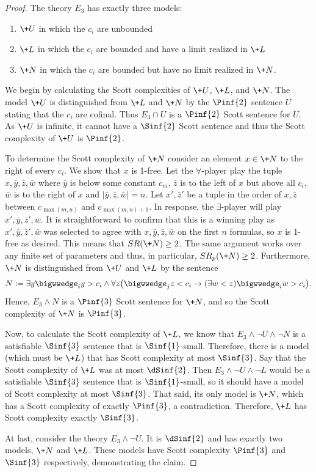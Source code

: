 \documentclass[10pt,a4paper]{amsart}
\renewcommand{\-}{\text{-}}
\begin{document}
\begin{proof}
The theory $E_3$ has exactly three models:
\begin{enumerate}
	\item $\+U$ in which the $c_i$ are unbounded
	\item $\+L$ in which the $c_i$ are bounded and have a limit realized in $\+L$
	\item $\+N$ in which the $c_i$ are bounded but have no limit realized in $\+N$.
\end{enumerate}
We begin by calculating the Scott complexities of $\+U$, $\+L$, and $\+N$.
The model $\+U$ is distinguished from $\+L$ and $\+N$ by the $\Pinf{2}$ sentence $U$ stating that the $c_i$ are cofinal. Thus $E_3\cap U$ is a $\Pinf{2}$ Scott sentence for $U$. As $\+U$ is infinite, it cannot have a $\Sinf{2}$ Scott sentence and thus the Scott complexity of $\+U$ is $\Pinf{2}$.

To determine the Scott complexity of $\+N$ consider an element $x\in \+N$ to the right of every $c_i$.
We show that $x$ is 1-free.
Let the $\forall$-player play the tuple $x,\bar y,\bar z,\bar w$ where $\bar y $ is below some constant $c_m$, $\bar z$ is to the left of $x$ but above all $c_i$, $\bar w$ is to the right of $x$ and $|\bar y,\bar z, \bar w|=n$.
Let $x',\bar{z}'$ be a tuple in the order of $x,\bar{z}$ between $c_{\max(m,n)}$ and $c_{\max(m,n)+1}$. 
In response, the $\exists$-player will play $x',\bar y,\bar z',\bar w$.
It is straightforward to confirm that this is a winning play as $x',\bar y,\bar z',\bar w$ was selected to agree with $x,\bar y,\bar z,\bar w$ on the first $n$ formulas, so $x$ is 1-free as desired.
This means that $SR(\+N)\geq 2$.
The same argument works over any finite set of parameters and thus, in particular, $SR_p(\+N)\geq 2$. %
Furthermore, $\+N$ is distinguished from $\+U$ and $\+L$ by the sentence 
\[N:=\exists y \bigwwedge_i y>c_i \land \forall z \big( \bigwwedge_j z<c_i \rightarrow (\exists w<z)  \bigwwedge_i w>c_i\big).\]
Hence, $E_3\land N$ is a $\Pinf{3}$ Scott sentence for $\+N$, and so the Scott complexity of $\+N$ is $\Pinf{3}$.

Now, to calculate the Scott complexity of $\+L$, we know that $E_3\land \lnot U\land \lnot N$ is a satisfiable $\Sinf{3}$ sentence that is $\Sinf{1}$-small.
Therefore, there is a model (which must be $\+L$) that has Scott complexity at most $\Sinf{3}$.
Say that the Scott complexity of $\+L$ was at most $\dSinf{2}$.
Then $E_3\land \lnot U\land \lnot L$ would be a satisfiable $\Sinf{3}$ sentence that is $\Sinf{1}$-small, so it should have a model of Scott complexity at most $\Sinf{3}$.
That said, its only model is $\+N$, which has a Scott complexity of exactly $\Pinf{3}$, a contradiction.
Therefore, $\+L$ has Scott complexity exactly $\Sinf{3}$.

At last, consider the theory $E_3\land\lnot U$.
It is $\dSinf{2}$ and has exactly two models, $\+N$ and $\+L$.
These models have Scott complexity $\Pinf{3}$ and $\Sinf{3}$ respectively, demonstrating the claim.
\end{proof}
\end{document}
